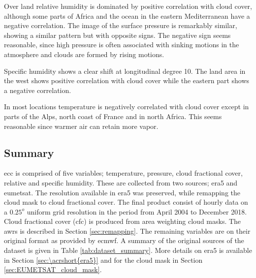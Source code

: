 Over land relative humidity is dominated by positive correlation with cloud cover, although some parts of Africa and the ocean in the eastern Mediterranean have a negative correlation. The image of the surface pressure is remarkably similar, showing a similar pattern but with opposite signs. The negative sign seems reasonable, since high pressure is often associated with sinking motions in the atmosphere and clouds are formed by rising motions. 

Specific humidity shows a clear shift at longitudinal degree 10. The land area in the west shows positive correlation with cloud cover while the eastern part shows a negative correlation. 

In most locations temperature is negatively correlated with cloud cover except in parts of the Alps, north coast of France and in north Africa. This seems reasonable since warmer air can retain more vapor.%


\subsection{Summary}
\acrshort{ecc} is comprised of five variables; temperature, pressure, cloud fractional cover, relative and specific humidity. These are collected from two sources; \acrshort{era5} and \acrshort{eumetsat}. The resolution available in \acrshort{era5} was preserved, while remapping the cloud mask to cloud fractional cover. 
The final product consist of %
hourly data on a $0.25^o$ uniform grid resolution in the period from April 2004 to December 2018. Cloud fractional cover (\acrshort{cfc}) is produced from area weighting cloud masks. The \acrshort{awrs} is described in Section \ref{sec:remapping}. The remaining variables are on their original format as provided by \acrfull{ecmwf}. A summary of the original sources of the dataset is given in Table \ref{tab:dataset_summary}. More details on \acrshort{era5} is available in Section \ref{sec:\acrshort{era5}} and for the cloud mask in Section \ref{sec:EUMETSAT_cloud_mask}. 
\clearpage

